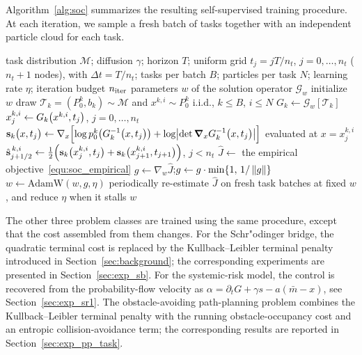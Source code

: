\documentclass[preprint]{elsarticle}
\newcommand{\sM}{\mathcal{M}}
\newcommand{\sT}{\mathcal{T}}
\newcommand{\sG}{\mathcal{G}}
\newcommand{\inv}{^{-1}}
\begin{document}
Algorithm~\ref{alg:soc} summarizes the resulting self-supervised training procedure. At each iteration, we sample a fresh batch of tasks together with an independent particle cloud for each task.

\begin{algorithm}[!htbp]
\caption{Self-supervised training of the solution operator on the single-well stochastic optimal control family $\sT=(p_0,V)$.}
\label{alg:soc}
\begin{algorithmic}[1]
    \Require task distribution $\sM$; diffusion $\gamma$; horizon $T$; uniform grid $t_j=jT/n_t$, $j=0,\ldots,n_t$ ($n_t+1$ nodes), with $\Delta t=T/n_t$; tasks per batch $B$; particles per task $N$; learning rate $\eta$; iteration budget
    $n_{\rm iter}$
    \Ensure parameters $w$ of the solution operator $\sG_w$
    \State initialize $w$
      \State draw $\sT_k=(P_0^k,b_k)\sim\sM$ and $x^{k,i}\sim P_0^k$ i.i.d., $k\le B$, $i\le N$
      \State $G_k\leftarrow\sG_w[\sT_k]$
      \State $x^{k,i}_j\leftarrow G_k\bigl(x^{k,i},t_j\bigr)$, \; $j=0,\ldots,n_t$
      \State $\mathbf{s}_k\qb{x,t_j}\leftarrow\nabla_x\Bigl[\log p_0^k\qb{G_k\inv\qb{x,t_j}}
             +\log\bigl|\det\boldsymbol{\nabla}_xG_k\inv\qb{x,t_j}\bigr|\Bigr]$
             evaluated at $x=x^{k,i}_j$
      \State $\hat{\mathbf{s}}^{\,k,i}_{j+1/2}\leftarrow\tfrac12
             \Bigl(\mathbf{s}_k\bigl(x^{k,i}_j,t_j\bigr)+\mathbf{s}_k\bigl(x^{k,i}_{j+1},t_{j+1}\bigr)\Bigr)$, \; $j<n_t$
      \State $\hat J\leftarrow$ the empirical objective~\eqref{equ:soc_empirical}
      \State $g\leftarrow\nabla_w\hat J$;\quad $g\leftarrow g\cdot\min\{1,\,1/\left\|g\right\|\}$
      \State $w\leftarrow\mathrm{AdamW}(w,g,\eta)$
      \State periodically re-estimate $\hat J$ on fresh task batches at fixed $w$, and reduce
             $\eta$ when it stalls
    \EndFor
    \State \Return $w$
\end{algorithmic}
\end{algorithm}

The other three problem classes are trained using the same procedure, except that the cost assembled from them changes. For the Schr"odinger bridge, the quadratic terminal cost is replaced by the Kullback--Leibler terminal penalty introduced in Section~\ref{sec:background}; the corresponding experiments are presented in Section~\ref{sec:exp_sb}. For the systemic-risk model, the control is recovered from the probability-flow velocity as $\alpha=\partial_tG+\gamma s-a(\bar m-x)$, see Section~\ref{sec:exp_sr1}. The obstacle-avoiding path-planning problem combines the Kullback--Leibler terminal penalty with the running obstacle-occupancy cost and an entropic collision-avoidance term; the corresponding results are reported in Section~\ref{sec:exp_pp_task}.
\end{document}
